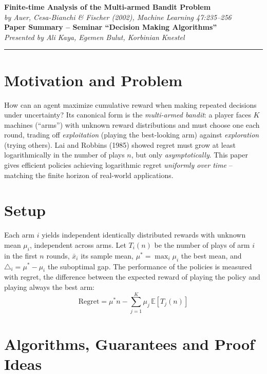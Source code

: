 \documentclass[10pt]{article}
\begin{document}
\begin{center}
  {\large\bfseries Finite-time Analysis of the Multi-armed Bandit Problem}\\[3pt]
  {\itshape by Auer, Cesa-Bianchi \& Fischer (2002), Machine Learning 47:235--256}\\[1pt]
  {\bfseries Paper Summary -- Seminar ``Decision Making Algorithms''}\\[1pt]
  {\itshape Presented by Ali Kaya, Egemen Bulut, Korbinian Knestel}
\end{center}
\vspace{2pt}
\hrule
\vspace{4pt}

\section{Motivation and Problem}
How can an agent maximize cumulative reward when making repeated decisions under uncertainty? Its canonical
form is the \emph{multi-armed bandit}: a player faces $K$ machines (``arms'') with unknown reward distributions
and must choose one each round, trading off \emph{exploitation} (playing the best-looking arm) against
\emph{exploration} (trying others). Lai and Robbins (1985) showed regret must grow at
least logarithmically in the number of plays $n$, but only \emph{asymptotically}. This paper gives efficient
policies achieving logarithmic regret \emph{uniformly over time} -- matching the finite horizon of real-world applications.

\section{Setup}
Each arm $i$ yields independent identically distributed rewards with unknown mean $\mu_{i}$, independent
across arms. Let $T_{i}(n)$ be the number of plays of arm $i$ in the first $n$ rounds, $\bar{x}_{i}$ its
sample mean, $\mu^{*}=\max_{i}\mu_{i}$ the best mean, and $\triangle_{i}=\mu^{*}-\mu_{i}$ the
suboptimal gap. The performance of the policies is measured with regret, the difference between the
expected reward of playing the policy and playing always the best arm:
\[
\text{Regret}=\mu^{*}n-\sum_{j=1}^{K}\mu_{j}\,\mathbb{E}[T_{j}(n)]
\]

\section{Algorithms, Guarantees and Proof Ideas}
\end{document}
